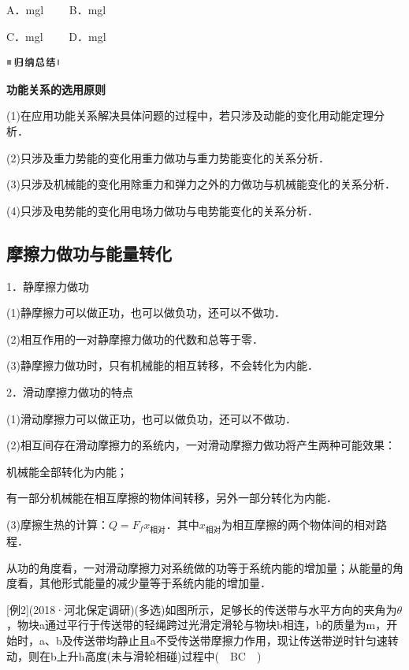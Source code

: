 \documentclass[cn,10.5pt,chinese,mac,chinesefont=founder]{elegantbook}
\begin{document}
A．mgl　　 B．mgl

C．mgl　　 D．mgl

\begin{center}\includegraphics[width=0.70764in,height=0.12292in]{media/image13.png}

\textbf{功能关系的选用原则}
\end{center}


(1)在应用功能关系解决具体问题的过程中，若只涉及动能的变化用动能定理分析．

(2)只涉及重力势能的变化用重力做功与重力势能变化的关系分析．

(3)只涉及机械能的变化用除重力和弹力之外的力做功与机械能变化的关系分析．

(4)只涉及电势能的变化用电场力做功与电势能变化的关系分析．


\subsection{摩擦力做功与能量转化}

1．静摩擦力做功

(1)静摩擦力可以做正功，也可以做负功，还可以不做功．

(2)相互作用的一对静摩擦力做功的代数和总等于零．

(3)静摩擦力做功时，只有机械能的相互转移，不会转化为内能．

2．滑动摩擦力做功的特点

(1)滑动摩擦力可以做正功，也可以做负功，还可以不做功．

(2)相互间存在滑动摩擦力的系统内，一对滑动摩擦力做功将产生两种可能效果：

机械能全部转化为内能；

有一部分机械能在相互摩擦的物体间转移，另外一部分转化为内能．

(3)摩擦生热的计算：$Q=F_fx_{\text{相对}}$．其中$x_{\text{相对}}$为相互摩擦的两个物体间的相对路程．

从功的角度看，一对滑动摩擦力对系统做的功等于系统内能的增加量；从能量的角度看，其他形式能量的减少量等于系统内能的增加量．

{[}例2{]}(2018·河北保定调研)(多选)如图所示，足够长的传送带与水平方向的夹角为$\theta$，物块a通过平行于传送带的轻绳跨过光滑定滑轮与物块b相连，b的质量为m，开始时，a、b及传送带均静止且a不受传送带摩擦力作用，现让传送带逆时针匀速转动，则在b上升h高度(未与滑轮相碰)过程中(　BC　)
\end{document}
